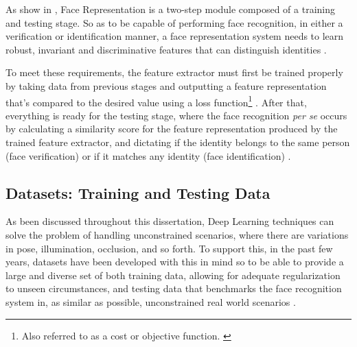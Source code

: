 \documentclass[class=report, crop=false, a4paper, 12pt]{standalone}
\begin{document}
\par As show in , Face Representation is a two-step module composed of a training and testing stage. So as to be capable of performing face recognition, in either a verification or identification manner, a face representation system needs to learn robust, invariant and discriminative features that can distinguish identities \autocite{ranjanDeepLearningUnderstanding2018}. 
\par To meet these requirements, the feature extractor must first be trained properly by taking data from previous stages and outputting a feature representation that's compared to the desired value using a loss function\footnote{Also referred to as a cost or objective function. \autocite{lecunDeepLearning2015}} \autocite{lecunDeepLearning2015, wangDeepFaceRecognition2021}. After that, everything is ready for the testing stage, where the face recognition \textit{per se} occurs by calculating a similarity score for the feature representation produced by the trained feature extractor, and dictating if the identity belongs to the same person (face verification) or if it matches any identity (face identification) \autocite{ranjanDeepLearningUnderstanding2018}.



\subsection{Datasets: Training and Testing Data}
\par As been discussed throughout this dissertation, Deep Learning techniques can solve the problem of handling unconstrained scenarios, where there are variations in pose, illumination, occlusion, and so forth. To support this, in the past few years, datasets have been developed with this in mind so to be able to provide a large and diverse set of both training data, allowing for adequate regularization to unseen circumstances, and testing data that benchmarks the face recognition system in, as similar as possible, unconstrained real world scenarios \autocite{duElementsEndtoendDeep2022}. 
\end{document}
